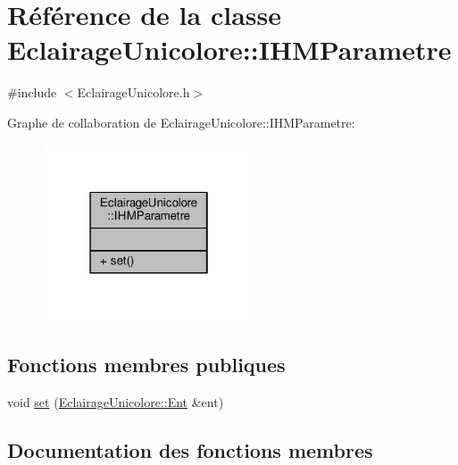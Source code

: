 \hypertarget{classEclairageUnicolore_1_1IHMParametre}{}\section{Référence de la classe Eclairage\+Unicolore\+:\+:I\+H\+M\+Parametre}
\label{classEclairageUnicolore_1_1IHMParametre}


{\ttfamily \#include $<$Eclairage\+Unicolore.\+h$>$}



Graphe de collaboration de Eclairage\+Unicolore\+:\+:I\+H\+M\+Parametre\+:
\nopagebreak
\begin{figure}[H]
\begin{center}
\leavevmode
\includegraphics[width=178pt]{classEclairageUnicolore_1_1IHMParametre__coll__graph}
\end{center}
\end{figure}
\subsection*{Fonctions membres publiques}
\begin{DoxyCompactItemize}
\item 
void \hyperlink{classEclairageUnicolore_1_1IHMParametre_a2cdd87935914fc4f101fa63daf4af0d5}{set} (\hyperlink{classEclairageUnicolore_1_1Ent}{Eclairage\+Unicolore\+::\+Ent} \&ent)
\end{DoxyCompactItemize}


\subsection{Documentation des fonctions membres}
\mbox{\label{classEclairageUnicolore_1_1IHMParametre_a2cdd87935914fc4f101fa63daf4af0d5}} 
